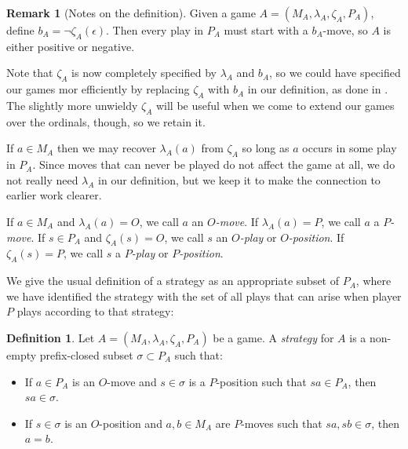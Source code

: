 \documentclass[11pt]{article} %
\theoremstyle{plain} %
\theoremstyle{definition} %
\newtheorem{definition}[theorem]{Definition}
\newtheorem{remark}[theorem]{Remark}
\theoremstyle{note}
\theoremstyle{exercisestyle}
\newcommand{\emptyplay}{\epsilon}
\begin{document}
\begin{remark}[Notes on the definition]
  Given a game $A=(M_A,\lambda_A,\zeta_A,P_A)$, define $b_A=\neg\zeta_A(\emptyplay)$.  Then every play in $P_A$ must start with a $b_A$-move, so $A$ is either positive or negative.

  Note that $\zeta_A$ is now completely specified by $\lambda_A$ and $b_A$, so we could have specified our games mor efficiently by replacing $\zeta_A$ with $b_A$ in our definition, as done in \cite{martinsthesis}.  The slightly more unwieldy $\zeta_A$ will be useful when we come to extend our games over the ordinals, though, so we retain it.

  If $a\in M_A$ then we may recover $\lambda_A(a)$ from $\zeta_A$ so long as $a$ occurs in some play in $P_A$.  Since moves that can never be played do not affect the game at all, we do not really need $\lambda_A$ in our definition, but we keep it to make the connection to earlier work clearer.

  If $a\in M_A$ and $\lambda_A(a)=O$, we call $a$ an \emph{$O$-move}.  If $\lambda_A(a)=P$, we call $a$ a \emph{$P$-move}.  If $s\in P_A$ and $\zeta_A(s)=O$, we call $s$ an \emph{$O$-play} or \emph{$O$-position}.  If $\zeta_A(s)=P$, we call $s$ a \emph{$P$-play} or \emph{$P$-position}.

\end{remark}

We give the usual definition of a strategy as an appropriate subset of $P_A$, where we have identified the strategy with the set of all plays that can arise when player $P$ plays according to that strategy:

\begin{definition}
  Let $A=(M_A,\lambda_A,\zeta_A,P_A)$ be a game.  A \emph{strategy} for $A$ is a non-empty prefix-closed subset $\sigma\subset P_A$ such that:
  \begin{itemize}
    \item If $a\in P_A$ is an $O$-move and $s\in\sigma$ is a $P$-position such that $sa\in P_A$, then $sa\in\sigma$.
    \item If $s\in\sigma$ is an $O$-position and $a,b\in M_A$ are $P$-moves such that $sa,sb\in\sigma$, then $a=b$.
  \end{itemize}
\end{definition}
\end{document}
